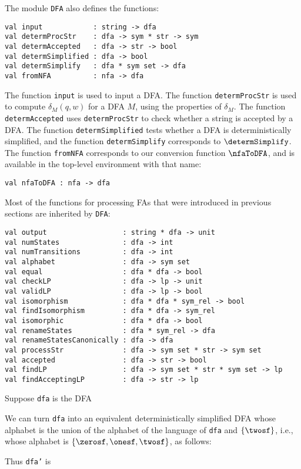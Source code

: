 The module \texttt{DFA} also defines the functions:
\begin{verbatim}
val input            : string -> dfa
val determProcStr    : dfa -> sym * str -> sym
val determAccepted   : dfa -> str -> bool
val determSimplified : dfa -> bool
val determSimplify   : dfa * sym set -> dfa
val fromNFA          : nfa -> dfa
\end{verbatim}
The function \texttt{input} is used to input a DFA.  The function
\texttt{determProcStr} is used to compute $\delta_M(q,w)$ for a DFA
$M$, using the properties of $\delta_M$.  The function
\texttt{determAccepted} uses \texttt{determProcStr} to check whether a
string is accepted by a DFA.  The function \texttt{determSimplified}
tests whether a DFA is deterministically simplified, and
the function \texttt{determSimplify}
corresponds to $\determSimplify$.  The function \texttt{fromNFA}
corresponds to our conversion function $\nfaToDFA$, and is available
in the top-level environment with that name:
\begin{verbatim}
val nfaToDFA : nfa -> dfa
\end{verbatim}

Most of the functions for processing FAs that were introduced
in previous sections are inherited by \texttt{DFA}:
\begin{verbatim}
val output                  : string * dfa -> unit 
val numStates               : dfa -> int
val numTransitions          : dfa -> int
val alphabet                : dfa -> sym set
val equal                   : dfa * dfa -> bool
val checkLP                 : dfa -> lp -> unit
val validLP                 : dfa -> lp -> bool
val isomorphism             : dfa * dfa * sym_rel -> bool
val findIsomorphism         : dfa * dfa -> sym_rel
val isomorphic              : dfa * dfa -> bool
val renameStates            : dfa * sym_rel -> dfa
val renameStatesCanonically : dfa -> dfa
val processStr              : dfa -> sym set * str -> sym set
val accepted                : dfa -> str -> bool
val findLP                  : dfa -> sym set * str * sym set -> lp
val findAcceptingLP         : dfa -> str -> lp
\end{verbatim}

Suppose \texttt{dfa} is the DFA
\begin{center}

\end{center}
We can turn \texttt{dfa} into an equivalent deterministically simplified
DFA whose alphabet is the union of the alphabet of the language
of \texttt{dfa} and $\{\twosf\}$, i.e., whose alphabet is
$\{\zerosf,\onesf,\twosf\}$, as follows:

Thus \texttt{dfa'} is
\begin{center}

\end{center}

